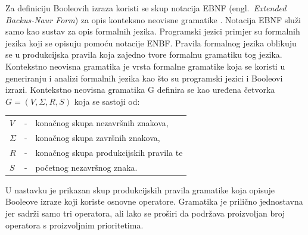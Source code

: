 \documentclass[times, utf8, diplomski]{fer}
\begin{document}
Za definiciju Booleovih izraza koristi se skup notacija EBNF (engl.~\textit{Extended Backus-Naur Form}) za opis konteksno neovisne gramatike \cite{book:jezproc}. Notacija EBNF služi samo kao sustav za opis formalnih jezika. Programski jezici primjer su formalnih jezika koji se opisuju pomoću notacije ENBF. Pravila formalnog jezika oblikuju se u produkcijska pravila koja zajedno tvore formalnu gramatiku tog jezika. Kontekstno neovisna gramatika je vrsta formalne gramatike koja se koristi u generiranju i analizi formalnih jezika kao što su programski jezici i Booleovi izrazi. Kontekstno neovisna gramatika G definira se kao uređena četvorka $G=(V, \Sigma, R, S)$ koja se sastoji od:
%
\begin{center}
	\begin{tabular}{lcl}
		$V$ & - & konačnog skupa nezavršnih znakova, \\
		$\Sigma$ & - & konačnog skupa završnih znakova, \\
		$R$ & - & konačnog skupa produkcijskih pravila te \\
		$S$ & - & početnog nezavršnog znaka.
	\end{tabular}
\end{center}

\noindent
U nastavku je prikazan skup produkcijskih pravila gramatike koja opisuje Booleove izraze koji koriste osnovne operatore. Gramatika je prilično jednostavna jer sadrži samo tri operatora, ali lako se proširi da podržava proizvoljan broj operatora s proizvoljnim prioritetima.
%
\begin{bnf}
	 \\
	 \\
	 \\
	 \\
\end{bnf}
\end{document}
